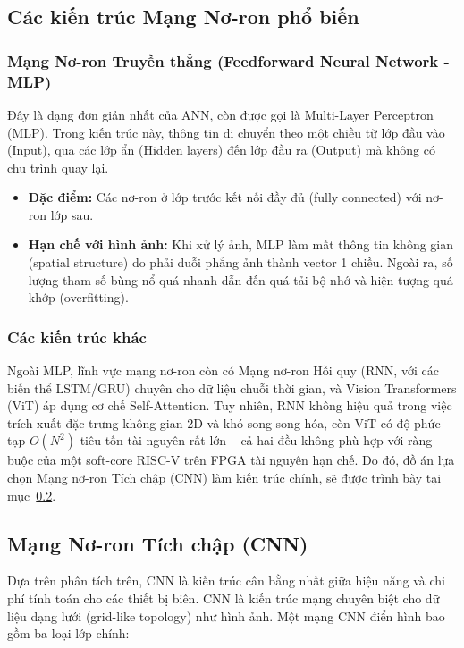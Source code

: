 \subsection{Các kiến trúc Mạng Nơ-ron phổ biến}

\subsubsection{Mạng Nơ-ron Truyền thẳng (Feedforward Neural Network - MLP)}
Đây là dạng đơn giản nhất của ANN, còn được gọi là Multi-Layer Perceptron (MLP). Trong kiến trúc này, thông tin di chuyển theo một chiều từ lớp đầu vào (Input), qua các lớp ẩn (Hidden layers) đến lớp đầu ra (Output) mà không có chu trình quay lại.
\begin{itemize}
    \item \textbf{Đặc điểm:} Các nơ-ron ở lớp trước kết nối đầy đủ (fully connected) với nơ-ron lớp sau.
    \item \textbf{Hạn chế với hình ảnh:} Khi xử lý ảnh, MLP làm mất thông tin không gian (spatial structure) do phải duỗi phẳng ảnh thành vector 1 chiều. Ngoài ra, số lượng tham số bùng nổ quá nhanh dẫn đến quá tải bộ nhớ và hiện tượng quá khớp (overfitting).
\end{itemize}

\subsubsection{Các kiến trúc khác}
Ngoài MLP, lĩnh vực mạng nơ-ron còn có Mạng nơ-ron Hồi quy (RNN, với các biến thể LSTM/GRU) chuyên cho dữ liệu chuỗi thời gian, và Vision Transformers (ViT) áp dụng cơ chế Self-Attention. Tuy nhiên, RNN không hiệu quả trong việc trích xuất đặc trưng không gian 2D và khó song song hóa, còn ViT có độ phức tạp $O(N^2)$ tiêu tốn tài nguyên rất lớn -- cả hai đều không phù hợp với ràng buộc của một soft-core RISC-V trên FPGA tài nguyên hạn chế. Do đó, đồ án lựa chọn Mạng nơ-ron Tích chập (CNN) làm kiến trúc chính, sẽ được trình bày tại mục~\ref{sec:cnn}.

\subsection{Mạng Nơ-ron Tích chập (CNN)}
\label{sec:cnn}
Dựa trên phân tích trên, CNN là kiến trúc cân bằng nhất giữa hiệu năng và chi phí tính toán cho các thiết bị biên. CNN là kiến trúc mạng chuyên biệt cho dữ liệu dạng lưới (grid-like topology) như hình ảnh. Một mạng CNN điển hình bao gồm ba loại lớp chính:

